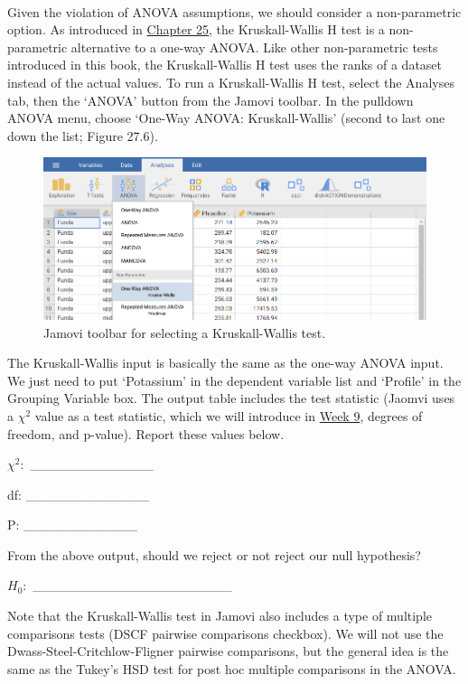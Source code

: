 \documentclass[
]{scrbook}
\begin{document}
\begin{verbatim}


\end{verbatim}

Given the violation of ANOVA assumptions, we should consider a non-parametric option.
As introduced in \protect\hyperlink{Chapter_25}{Chapter 25}, the Kruskall-Wallis H test is a non-parametric alternative to a one-way ANOVA.
Like other non-parametric tests introduced in this book, the Kruskall-Wallis H test uses the ranks of a dataset instead of the actual values.
To run a Kruskall-Wallis H test, select the Analyses tab, then the `ANOVA' button from the Jamovi toolbar.
In the pulldown ANOVA menu, choose `One-Way ANOVA: Kruskall-Wallis' (second to last one down the list; Figure 27.6).

\begin{figure}
\includegraphics[width=1\linewidth]{img/jamovi_Kruskall-Wallis_toolbar} \caption{Jamovi toolbar for selecting a Kruskall-Wallis test.}\label{fig:unnamed-chunk-131}
\end{figure}

The Kruskall-Wallis input is basically the same as the one-way ANOVA input.
We just need to put `Potassium' in the dependent variable list and `Profile' in the Grouping Variable box.
The output table includes the test statistic (Jaomvi uses a \(\chi^{2}\) value as a test statistic, which we will introduce in \protect\hyperlink{Week9}{Week 9}, degrees of freedom, and p-value).
Report these values below.

\(\chi^{2}:\) \_\_\_\_\_\_\_\_\_\_\_\_\_

df: \_\_\_\_\_\_\_\_\_\_\_\_\_

P: \_\_\_\_\_\_\_\_\_\_\_\_

From the above output, should we reject or not reject our null hypothesis?

\(H_{0}:\) \_\_\_\_\_\_\_\_\_\_\_\_\_\_\_\_\_\_\_\_\_

Note that the Kruskall-Wallis test in Jamovi also includes a type of multiple comparisons tests (DSCF pairwise comparisons checkbox).
We will not use the Dwass-Steel-Critchlow-Fligner pairwise comparisons, but the general idea is the same as the Tukey's HSD test for post hoc multiple comparisons in the ANOVA.
\end{document}
